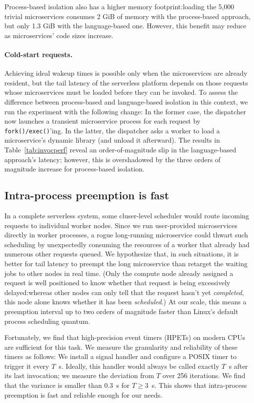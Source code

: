 Process-based isolation also has a higher memory footprint:\@ loading the 5,000
trivial microservices consumes 2 GiB of memory with the process-based approach, but
only 1.3 GiB with the language-based one.  However, this benefit may reduce as
microservices' code sizes increase.

\paragraph{Cold-start requests.}
Achieving ideal wakeup times is possible only when the microservices are
already resident, but the tail latency of the serverless platform depends on
those requests whose microservices must be loaded
before they can be invoked.  To assess the difference between process-based and
language-based isolation in this context, we run the experiment with the following
change:  In the former case, the dispatcher now launches a transient
microservice process for each request by \texttt{fork()/exec()}'ing.  In the latter,
the dispatcher asks a worker to load a microservice's dynamic library (and
unload it afterward).  The results in Table~\ref{tab:invocperf} reveal an
order-of-magnitude slip in the language-based approach's latency; however, this is
overshadowed by the three orders of magnitude increase for process-based
isolation.

\subsection{Intra-process preemption is fast}
In a complete serverless system, some cluser-level scheduler would route incoming
requests to individual worker nodes.  Since we run user-provided
microservices directly in worker processes, a rogue long-running microservice could
thwart such scheduling by unexpectedly consuming the resources of a worker that
already had numerous other requests queued.  We hypothesize that, in such situations,
it is better for tail latency to preempt the long microservice than retarget the
waiting jobs to other nodes in real time.  (Only the compute node already assigned a
request is well positioned to know whether that request is being excessively
delayed:\@ whereas other nodes can only tell that the request hasn't yet
\textit{completed}, this node alone knows whether it has been \textit{scheduled}.)
At our scale, this means a preemption interval up to two orders of magnitude faster
than Linux's default  process scheduling quantum.

Fortunately, we find that high-precision event timers (HPETs) on modern CPUs
are sufficient for this task. We measure the granularity and reliability of
these timers as follows: We install a signal handler and configure a POSIX timer to
trigger it every $T$~\textmu{}s.
Ideally, this handler would always be called exactly $T$~\textmu{}s after its last
invocation; we measure the deviation from $T$ over 256 iterations.
We find that the variance
is smaller than 0.3~\textmu{}s for $T \ge 3$~\textmu{}s. This shows that
intra-process preemption is fast and reliable enough for our needs.
